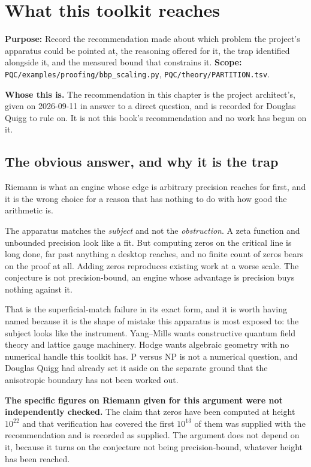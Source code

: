 \chapter{What this toolkit reaches}

\textbf{Purpose:} Record the recommendation made about which problem the project's apparatus could
be pointed at, the reasoning offered for it, the trap identified alongside it, and the measured
bound that constrains it. \textbf{Scope:}
\texttt{PQC/\allowbreak{}examples/\allowbreak{}proofing/\allowbreak{}bbp\_\allowbreak{}scaling.\allowbreak{}py},
\texttt{PQC/\allowbreak{}theory/\allowbreak{}PARTITION.\allowbreak{}tsv}.

\textbf{Whose this is.} The recommendation in this chapter is the project architect's, given on
2026-09-11 in answer to a direct question, and is recorded for Douglas Quigg to rule on. It is not
this book's recommendation and no work has begun on it.

\section{The obvious answer, and why it is the trap}

Riemann is what an engine whose edge is arbitrary precision reaches for first, and it is the wrong
choice for a reason that has nothing to do with how good the arithmetic is.

The apparatus matches the \emph{subject} and not the \emph{obstruction}. A zeta function and
unbounded precision look like a fit. But computing zeros on the critical line is long done, far past
anything a desktop reaches, and no finite count of zeros bears on the proof at all. Adding zeros
reproduces existing work at a worse scale. The conjecture is not precision-bound, an engine
whose advantage is precision buys nothing against it.

That is the superficial-match failure in its exact form, and it is worth having named because it is
the shape of mistake this apparatus is most exposed to: the subject looks like the instrument.
Yang--Mills wants constructive quantum field theory and lattice gauge machinery. Hodge wants
algebraic geometry with no numerical handle this toolkit has. P versus NP is not a numerical
question, and Douglas Quigg had already set it aside on the separate ground that the anisotropic
boundary has not been worked out.

\textbf{The specific figures on Riemann given for this argument were not independently checked.}
The claim that zeros have been computed at height $10^{22}$ and that verification has covered the
first $10^{13}$ of them was supplied with the recommendation and is recorded as supplied. The
argument does not depend on it, because it turns on the conjecture not being precision-bound,
whatever height has been reached.

